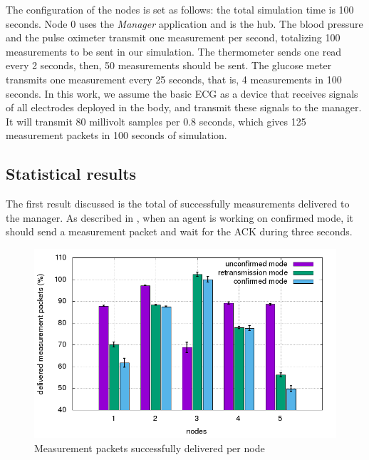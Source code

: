 The configuration of the nodes is set as follows: the total simulation time is 100 seconds. Node 0 uses the \textit{Manager} application and is the hub. The blood pressure and the pulse oximeter transmit one measurement per second, totalizing 100 measurements to be sent in our simulation. The thermometer sends one read every 2 seconds, then, 50 measurements should be sent. The glucose meter transmits one measurement every 25 seconds, that is, 4 measurements in 100 seconds. In this work, we assume the basic ECG as a device that receives signals of all electrodes deployed in the body, and transmit these signals to the manager. It will transmit 80 millivolt samples per 0.8 seconds, which gives 125 measurement packets in 100 seconds of simulation.

\subsection{Statistical results}


The first result discussed is the total of successfully measurements delivered to the manager. As described in \cite{b1}, when an agent is working on confirmed mode, it  should send a measurement packet and wait for the ACK during three seconds. 

\begin{figure}[htbp]
\centerline{\includegraphics[scale=0.4]{figures/averagemeasurementpacketreceivedpernode.png}}
\caption{Measurement packets successfully delivered per node}
\label{fig:measurementreceivedpernode}
\end{figure}

